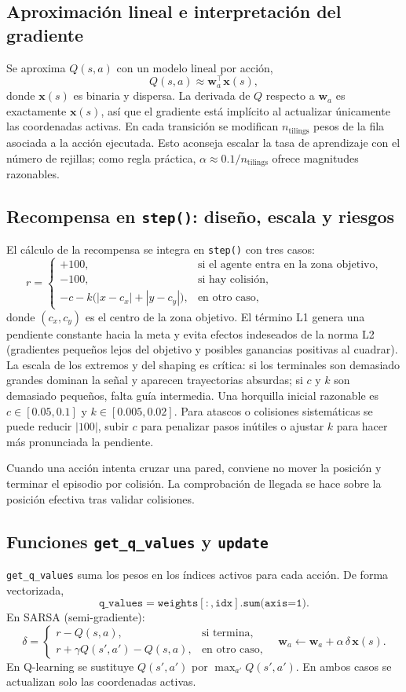 \documentclass[a4paper,12pt]{article}
\begin{document}
\subsection{Aproximación lineal e interpretación del gradiente}
Se aproxima $Q(s,a)$ con un modelo lineal por acción,
\[
Q(s,a)\approx \mathbf{w}_a^{\top}\mathbf{x}(s),
\]
donde $\mathbf{x}(s)$ es binaria y dispersa. La derivada de $Q$ respecto a $\mathbf{w}_a$ es exactamente $\mathbf{x}(s)$, así que el gradiente está implícito al actualizar únicamente las coordenadas activas. En cada transición se modifican $n_{\text{tilings}}$ pesos de la fila asociada a la acción ejecutada. Esto aconseja escalar la tasa de aprendizaje con el número de rejillas; como regla práctica, $\alpha\approx 0.1/n_{\text{tilings}}$ ofrece magnitudes razonables.

\subsection{Recompensa en \texttt{step()}: diseño, escala y riesgos}
El cálculo de la recompensa se integra en \texttt{step()} con tres casos:
\[
r=
\begin{cases}
+100, & \text{si el agente entra en la zona objetivo},\\
-100, & \text{si hay colisión},\\
- c - k\bigl(|x-c_x|+|y-c_y|\bigr), & \text{en otro caso},
\end{cases}
\]
donde $(c_x,c_y)$ es el centro de la zona objetivo. El término L1 genera una pendiente constante hacia la meta y evita efectos indeseados de la norma L2 (gradientes pequeños lejos del objetivo y posibles ganancias positivas al cuadrar). La escala de los extremos y del shaping es crítica: si los terminales son demasiado grandes dominan la señal y aparecen trayectorias absurdas; si $c$ y $k$ son demasiado pequeños, falta guía intermedia. Una horquilla inicial razonable es $c\in[0.05,0.1]$ y $k\in[0.005,0.02]$. Para atascos o colisiones sistemáticas se puede reducir $|100|$, subir $c$ para penalizar pasos inútiles o ajustar $k$ para hacer más pronunciada la pendiente.

Cuando una acción intenta cruzar una pared, conviene no mover la posición y terminar el episodio por colisión. La comprobación de llegada se hace sobre la posición efectiva tras validar colisiones.

\subsection{Funciones \texttt{get\_q\_values} y \texttt{update}}
\texttt{get\_q\_values} suma los pesos en los índices activos para cada acción. De forma vectorizada,
\[
\texttt{q\_values}=\texttt{weights}[:,\texttt{idx}].\texttt{sum(axis=1)}.
\]
En SARSA (semi-gradiente):
\[
\delta=\begin{cases}
r - Q(s,a), & \text{si termina},\\
r + \gamma Q(s',a') - Q(s,a), & \text{en otro caso},
\end{cases}
\quad
\mathbf{w}_a \leftarrow \mathbf{w}_a + \alpha\,\delta\,\mathbf{x}(s).
\]
En Q-learning se sustituye $Q(s',a')$ por $\max_{a'}Q(s',a')$. En ambos casos se actualizan solo las coordenadas activas.
\end{document}
